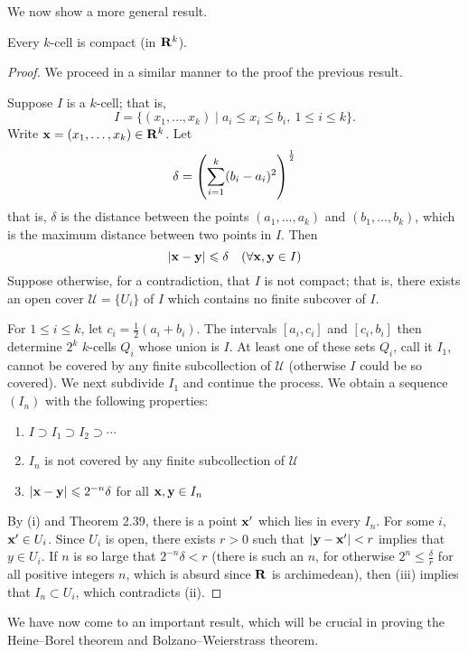 We now show a more general result.

\begin{lemma}\label{lemma:k-cell-compact}
Every $k$-cell is compact (in $\mathbf R^k$).
\end{lemma}

\begin{proof}
We proceed in a similar manner to the proof the previous result.

Suppose $I$ is a $k$-cell; that is,
\[I=\{(x_1,\dots,x_k)\mid a_i\le x_i\le b_i,\:1\le i\le k\}.\]
Write $\vb{x}=(x_1,\dots,x_k)\in\mathbf R^k$. Let
\[\delta=\left(\sum_{i=1}^{k}(b_i-a_i)^2\right)^\frac{1}{2}\]
that is, $\delta$ is the distance between the points $(a_1,\dots,a_k)$ and $(b_1,\dots,b_k)$, which is the maximum distance between two points in $I$. Then
\[|\vb{x}-\vb{y}|\leqslant\delta\quad(\forall\vb{x},\vb{y}\in I)\]
Suppose otherwise, for a contradiction, that $I$ is not compact; that is, there exists an open cover $\mathcal{U}=\{U_i\}$ of $I$ which contains no finite subcover of $I$. 

For $1\le i\le k$, let $c_i=\frac{1}{2}(a_i+b_i)$. The intervals $[a_i,c_i]$ and $[c_i,b_i]$ then determine $2^k$ $k$-cells $Q_i$ whose union is $I$. At least one of these sets $Q_i$, call it $I_1$, cannot be covered by any finite subcollection of $\mathcal{U}$ (otherwise $I$ could be so covered). We next subdivide $I_1$ and continue the process. We obtain a sequence $(I_n)$ with the following properties:
\begin{enumerate}[label=(\roman*)]
\item $I\supset I_1\supset I_2\supset\cdots$
\item $I_n$ is not covered by any finite subcollection of $\mathcal{U}$
\item $|\vb{x}-\vb{y}|\leqslant2^{-n}\delta$ for all $\vb{x},\vb{y}\in I_n$
\end{enumerate}
By (i) and Theorem 2.39, there is a point $\vb{x}^\prime$ which lies in every $I_n$. For some $i$, $\vb{x}^\prime\in U_i$. Since $U_i$ is open, there exists $r>0$ such that $|\vb{y}-\vb{x}^\prime|<r$ implies that $y\in U_i$. If $n$ is so large that $2^{-n}\delta<r$ (there is such an $n$, for otherwise $2^n\le\frac{\delta}{r}$ for all positive integers $n$, which is absurd since $\mathbf R$ is archimedean), then (iii) implies that $I_n\subset U_i$, which contradicts (ii).
\end{proof}

We have now come to an important result, which will be crucial in proving the Heine--Borel theorem and Bolzano--Weierstrass theorem.

